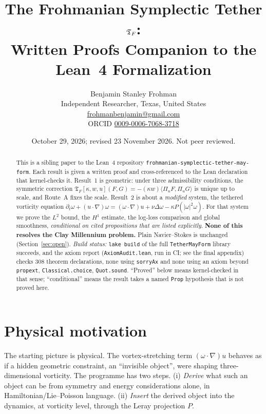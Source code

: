 \documentclass[11pt]{article}
\title{The Frohmanian Symplectic Tether $\T$:\\ Written Proofs Companion to the Lean~4 Formalization}
\author{Benjamin Stanley Frohman\\ Independent Researcher, Texas, United States\\ \small\href{mailto:frohmanbenjamin@gmail.com}{frohmanbenjamin@gmail.com}\\ \small ORCID \href{https://orcid.org/0009-0006-7068-3718}{0009-0006-7068-3718}}
\date{October 29, 2026; revised 23 November 2026. Not peer reviewed.}
\theoremstyle{definition}
\theoremstyle{remark}
\newcommand{\T}{\mathfrak{T}_F}
\newcommand{\ip}[2]{\langle #1,#2\rangle}
\begin{document}
\maketitle
\begin{abstract}
This is a sibling paper to the Lean~4 repository \texttt{frohmanian-symplectic-tether-may-form}.
Each result is given a written proof and cross-referenced to the Lean declaration that
kernel-checks it. Result~1 is geometric: under three admissibility conditions, the symmetric
correction $\T[\kappa,w,u](F,G)=-(\kappa w)\ip{\Pi_uF}{\Pi_uG}$ is unique up to scale, and
Route~A fixes the scale. Result~2 is about a \emph{modified} system, the tethered vorticity equation
$\partial_t\omega+(u\cdot\nabla)\omega=(\omega\cdot\nabla)u+\nu\Delta\omega-\kappa P(|\omega|^2\omega)$.
For that system we prove the $L^2$ bound, the $H^1$ estimate, the log-loss comparison and global
smoothness, \emph{conditional on cited propositions that are listed explicitly}.
\textbf{None of this resolves the Clay Millennium problem.} Plain Navier--Stokes is unchanged
(Section~\ref{sec:open}).
\emph{Build status:} \texttt{lake build} of the full \texttt{TetherMayForm} library succeeds, and the axiom report
(\texttt{AxiomAudit.lean}, run in CI; see the final appendix) checks 308 theorem declarations, none using \texttt{sorryAx}
and none using an axiom beyond \texttt{propext}, \texttt{Classical.choice}, \texttt{Quot.sound}. ``Proved'' below
means kernel-checked in that sense; ``conditional'' means the result takes a named \texttt{Prop} hypothesis
that is not proved here.
\end{abstract}

\section{Physical motivation}\label{sec:motivation}
The starting picture is physical. The vortex-stretching term $(\omega\cdot\nabla)u$ behaves as if
a hidden geometric constraint, an ``invisible object'', were shaping three-dimensional vorticity. The
programme has two steps. (i) \emph{Derive} what such an object can be from symmetry and
energy considerations alone, in Hamiltonian/Lie--Poisson language. (ii) \emph{Insert} the derived
object into the dynamics, at vorticity level, through the Leray projection $P$.
\end{document}
